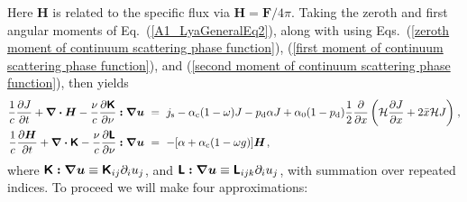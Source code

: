 \documentclass[fleqn,usenatbib]{mnras}
\begin{document}
Here $\boldsymbol{H}$ is related to the specific flux via $\boldsymbol{H} = \boldsymbol{F}/4 \pi$. Taking the zeroth and first angular moments of Eq.~(\ref{A1_LyaGeneralEq2}), along with using Eqs.~(\ref{zeroth moment of continuum scattering phase function}), (\ref{first moment of continuum scattering phase function}), and (\ref{second moment of continuum scattering phase function}), then yields
\begin{align}
      \dfrac{1}{c} \dfrac{\partial J}{\partial t} + \boldsymbol{\nabla} \boldsymbol{\cdot} \boldsymbol{H} - \dfrac{\nu}{c }  \dfrac{\partial  \textbf{\textsf{K}}}{\partial \nu} \boldsymbol{:} \boldsymbol{\nabla u}  ~&=~ j_{\rm s} - \alpha_{\rm c}(1-\omega)J - p_{\rm d} \alpha J + \alpha_0 (1 - p_{\rm d})  \dfrac{1}{2} \dfrac{\partial}{\partial x} \left( \mathcal{H} \dfrac{\partial J}{\partial x} +  2 \Bar{x} \mathcal{H} J \right)  \hspace{1 pt} , \\
      \dfrac{1}{c} \dfrac{\partial \boldsymbol{H}}{\partial t} + \boldsymbol{\nabla} \boldsymbol{\cdot} \textbf{\textsf{K}} - \dfrac{\nu}{c }  \dfrac{\partial \textbf{\textsf{L}}}{\partial \nu} \boldsymbol{:} \boldsymbol{\nabla u}  ~&=~  - [\alpha + \alpha_{\rm c}(1 - \omega g)] \boldsymbol{H} \hspace{1 pt} \label{div K equation},
\end{align}
where $\textbf{\textsf{K}} \boldsymbol{:} \boldsymbol{\nabla u} \equiv \textbf{\textsf{K}}_{ij} \partial_{i} u_{j}$, and $\textbf{\textsf{L}} \boldsymbol{:} \boldsymbol{\nabla u} \equiv \textbf{\textsf{L}}_{ijk} \partial_{i} u_{j}$, with summation over repeated indices. To proceed we will make four approximations: 
\end{document}
